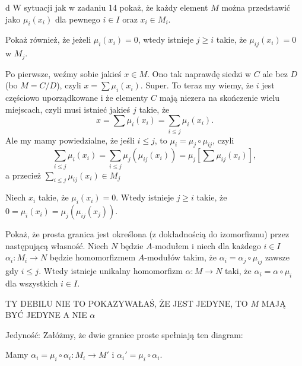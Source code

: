 \documentclass{article}
\begin{document}
\begin{problem}[15]{d}
W sytuacji jak w zadaniu 14 pokaż, że każdy element $M$ można przedstawić jako $\mu_i(x_i)$ dla pewnego $i\in I$ oraz $x_i\in M_i$.

Pokaż również, że jeżeli $\mu_i(x_i)=0$, wtedy istnieje $j\geq i$ takie, że $\mu_{ij}(x_i)=0$ w $M_j$.
\end{problem}

Po pierwsze, weźmy sobie jakieś $x\in M$. Ono tak naprawdę siedzi w $C$ ale bez $D$ (bo $M=C/D$), czyli $x=\sum \mu_i(x_i)$. Super. To teraz my wiemy, że $i$ jest częściowo uporządkowane i że elementy $C$ mają niezera na skończenie wielu miejscach, czyli musi istnieć jakieś $j$ takie, że
$$x=\sum \mu_i(x_i)=\sum_{i\leq j}\mu_i(x_i).$$
Ale my mamy powiedzialne, że jeśli $i\leq j$, to $\mu_i=\mu_j\circ\mu_{ij}$, czyli
$$\sum_{i\leq j}\mu_i(x_i)=\sum_{i\leq j}\mu_j(\mu_{ij}(x_i))=\mu_j\left[\sum\mu_{ij}(x_i)\right],$$
a przecież $\sum_{i\leq j}\mu_{ij}(x_i)\in M_j$

Niech $x_i$ takie, że $\mu_i(x_i)=0$. Wtedy istnieje $j\geq i$ takie, że $0=\mu_i(x_i)=\mu_j(\mu_{ij}(x_j))$. 

\begin{problem}[16]{}
Pokaż, że prosta granica jest określona (z dokładnością do izomorfizmu) przez następującą własność. Niech $N$ będzie $A$-modułem i niech dla każdego $i\in I$ $\alpha_i:M_i\to N$ będzie homomorfizmem $A$-modułów takim, że $\alpha_i=\alpha_j\circ\mu_{ij}$ zawsze gdy $i\leq j$. Wtedy istnieje unikalny homomorfizm $\alpha:M\to N$ taki, że $\alpha_i=\alpha\circ\mu_i$ dla wszystkich $i\in I$.
\end{problem}

{\largle\color{orange}TY DEBILU NIE TO POKAZYWAŁAŚ, ŻE JEST JEDYNE, TO $M$ MAJĄ BYĆ JEDYNE A NIE $\alpha$}

Jedyność: Załóżmy, że dwie granice proste spełniają ten diagram:

\begin{center}\end{center}

Mamy $\alpha_i=\mu_i\circ\alpha_i :M_i\to M'$ i $\alpha_i'=\mu_i\circ\alpha_i$.
\end{document}
